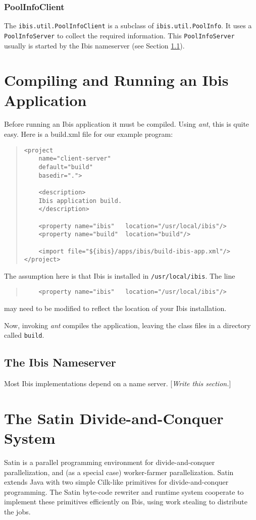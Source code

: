 \documentclass[10pt]{article}
\newcommand{\mysection}[1]{\section{#1}\label{#1}}
\newcommand{\mysubsection}[1]{\subsection{#1}\label{#1}}
\newcommand{\mysubsubsection}[1]{\subsubsection{#1}\label{#1}}
\newcommand{\remark}[1]{[\emph{#1}]}
\begin{document}
\mysubsubsection{PoolInfoClient}

The \verb+ibis.util.PoolInfoClient+ is a subclass of
\verb+ibis.util.PoolInfo+.
It uses a \verb+PoolInfoServer+ to collect the required information.
This \verb+PoolInfoServer+ usually is started by the Ibis nameserver
(see Section \ref{The Ibis Nameserver}).

\mysection{Compiling and Running an Ibis Application}

Before running an Ibis application it must be compiled.
Using \emph{ant}, this is quite easy. Here is a build.xml file for
our example program:

\begin{quote}
\begin{verbatim}
<project
    name="client-server"
    default="build"
    basedir=".">

    <description>
    Ibis application build.
    </description>

    <property name="ibis"   location="/usr/local/ibis"/>
    <property name="build"  location="build"/>

    <import file="${ibis}/apps/ibis/build-ibis-app.xml"/>
</project>
\end{verbatim}
\end{quote}
The assumption here is that Ibis is installed in
\verb+/usr/local/ibis+.
The line
\begin{quote}
\begin{verbatim}
    <property name="ibis"   location="/usr/local/ibis"/>
\end{verbatim}
\end{quote}
\noindent
may need to be modified to reflect the location of your Ibis
installation.

Now, invoking \emph{ant} compiles the application, leaving the class files
in a directory called \verb+build+.

\mysubsection{The Ibis Nameserver}

Most Ibis implementations depend on a name server.
\remark{Write this section.}

\mysection{The Satin Divide-and-Conquer System}

Satin is a parallel programming environment for divide-and-conquer
parallelization, and (as a special case) worker-farmer parallelization.
Satin extends Java with two simple Cilk-like primitives for
divide-and-conquer programming.  The Satin byte-code rewriter and
runtime system cooperate to implement these primitives efficiently on
Ibis, using work stealing to distribute the jobs.
\end{document}
